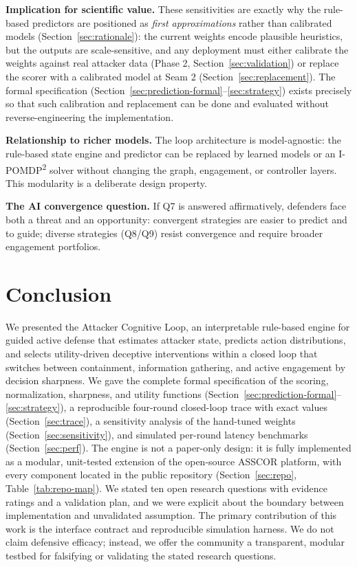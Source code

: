 \documentclass[preprints,article,accept,oneauthor]{Definitions/mdpi}
\begin{document}
\textbf{Implication for scientific value.} These sensitivities are exactly
why the rule-based predictors are positioned as \textit{first
approximations} rather than calibrated models (Section~\ref{sec:rationale}): the
current weights encode plausible heuristics, but the outputs are
scale-sensitive, and any deployment must either calibrate the weights
against real attacker data (Phase 2, Section~\ref{sec:validation}) or replace the
scorer with a calibrated model at Seam 2 (Section~\ref{sec:replacement}). The
formal specification (Section~\ref{sec:prediction-formal}--\ref{sec:strategy})
exists precisely so that such calibration and replacement can be done and
evaluated without reverse-engineering the implementation.

\textbf{Relationship to richer models.} The loop architecture is
model-agnostic: the rule-based state engine and predictor can be replaced by
learned models or an I-POMDP\textsuperscript{2} solver without changing the
graph, engagement, or controller layers. This modularity is a deliberate
design property.

\textbf{The AI convergence question.} If Q7 is answered affirmatively,
defenders face both a threat and an opportunity: convergent strategies are
easier to predict and to guide; diverse strategies (Q8/Q9) resist
convergence and require broader engagement portfolios.

\section{Conclusion}
\label{sec:conclusion}

We presented the Attacker Cognitive Loop, an interpretable rule-based engine
for guided active defense that estimates attacker state, predicts action
distributions, and selects utility-driven deceptive interventions within a
closed loop that switches between containment, information gathering, and
active engagement by decision sharpness. We gave the complete formal
specification of the scoring, normalization, sharpness, and utility
functions (Section~\ref{sec:prediction-formal}--\ref{sec:strategy}), a
reproducible four-round closed-loop trace with exact values
(Section~\ref{sec:trace}), a sensitivity analysis of the hand-tuned weights
(Section~\ref{sec:sensitivity}), and simulated per-round latency benchmarks
(Section~\ref{sec:perf}). The engine is not a paper-only design: it is fully
implemented as a modular, unit-tested extension of the open-source ASSCOR
platform, with every component located in the public repository
(Section~\ref{sec:repo}, Table~\ref{tab:repo-map}). We stated ten open
research questions with evidence ratings and a validation plan, and we were
explicit about the boundary between implementation and unvalidated
assumption. The primary contribution of this work is the interface contract
and reproducible simulation harness. We do not claim defensive efficacy;
instead, we offer the community a transparent, modular testbed for
falsifying or validating the stated research questions.
\end{document}
